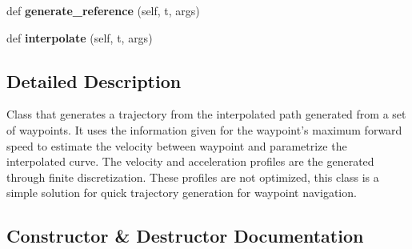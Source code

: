 \begin{DoxyCompactItemize}
\item 
\mbox{\label{classuuv__trajectory__generator_1_1wp__trajectory__generator_1_1WPTrajectoryGenerator_a0273253c676669db87d78c4bed035e5b}} 
def {\bfseries generate\+\_\+reference} (self, t, args)
\item 
\mbox{\label{classuuv__trajectory__generator_1_1wp__trajectory__generator_1_1WPTrajectoryGenerator_a11e82df56fa4300eeecc78326a3ff264}} 
def {\bfseries interpolate} (self, t, args)
\end{DoxyCompactItemize}


\subsection{Detailed Description}
\begin{DoxyVerb}Class that generates a trajectory from the interpolated path generated
from a set of waypoints. It uses the information given for the waypoint's
maximum forward speed to estimate the velocity between waypoint and
parametrize the interpolated curve.
The velocity and acceleration profiles are the generated through finite
discretization. These profiles are not optimized, this class is a
simple solution for quick trajectory generation for waypoint navigation.
\end{DoxyVerb}
 

\subsection{Constructor \& Destructor Documentation}
\mbox{\label{classuuv__trajectory__generator_1_1wp__trajectory__generator_1_1WPTrajectoryGenerator_a8b7c95b3f0708670b211e6588664c5b1}} 
